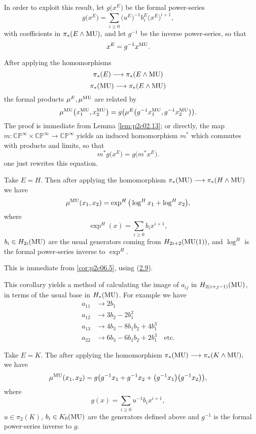 \documentclass[../main]{subfiles}
\begin{document}
In order to exploit this result, let $g\big(x^E\big)$ be the formal power-series
\begin{equation}
\label{eqn:p2c06.4}
\tag{6.4}
    g\big(x^E\big)=\sum_{i\geq 0}\big(u^E\big)^{-1}b_i^E\big(x^E\big)^{i+1},
\end{equation}
with coefficients in $\pi_\ast(E\wedge \mathrm{MU}),$ and let $g^{-1}$ be the inverse power-series, so that
\[x^E=g^{-1}x^{\mathrm{MU}}.\]

\begin{customcor}{6.5}
\label{cor:p2c06.5}
After applying the homomorphisms
\[\pi_\ast(E)\longrightarrow \pi_\ast(E\wedge \mathrm{MU})\]
\[\pi_\ast(\mathrm{MU})\longrightarrow \pi_\ast(E\wedge \mathrm{MU})\]
the formal products $\mu^E,\mu^{\mathrm{MU}}$ are related by 
\[\mu^{\mathrm{MU}}\big(x_1^{\mathrm{MU}},x_2^{\mathrm{MU}}\big)=g\big(\mu^E\big(g^{-1}x_1^{\mathrm{MU}},g^{-1}x_2^{\mathrm{MU}}\big)\big).\]
The proof is immediate from Lemma \ref{lem:p2c02.13}; or directly, the map \newline $m:\mathbb{CP}^\infty\times\mathbb{CP}^\infty\longrightarrow \mathbb{CP}^\infty$ yields an induced homomorphism $m^\ast$ which commutes with products and limits, so that 
\[m^\ast g\big(x^E\big)=g\big(m^\ast x^E\big).\]
one just rewrites this equation.
\end{customcor}
\begin{customcor}{6.6}
\label{cor:p2c06.6}
Take $E=H.$ Then after applying the homomorphism $\pi_\ast(\mathrm{MU})\longrightarrow \pi_\ast(H\wedge \mathrm{MU})$ we have 
\[\mu^{\mathrm{MU}}(x_1,x_2)=\exp^H\big(\log^Hx_1+\log^Hx_2\big),\]
where 
\[\exp^H(x)=\sum_{i\geq 0}b_ix^{i+1},\]
$b_i\in H_{2i}(\mathrm{MU})$ are the usual generators coming from $H_{2i+2}(\mathrm{MU}(1))$, and $\log^H$ is the formal power-series inverse to $\exp^H$.
\end{customcor}
This is immediate from \eqref{cor:p2c06.5}, using (\hyperref[ex:p2c02.9]{2.9}).

This corollary yields a method of calculating the image of $a_{ij}$ in $H_{2(i+j-1)}(\mathrm{MU})$, in terms of the usual base in $H_\ast(\mathrm{MU})$. For example we have 
\begin{align*}
    a_{11} &\longrightarrow 2b_1  \\
    a_{12} &\longrightarrow 3b_2-2b_1^2  \\ 
    a_{13} &\longrightarrow 4b_3-8b_1b_2+4b_1^3  \\
    a_{22} &\longrightarrow 6b_3-6b_1b_2+2b_1^3 \quad \text{etc.} 
\end{align*}
\begin{customcor}{6.7}
\label{cor:p2c06.7}
Take $E=K$. The after applying the homomorphism $\pi_\ast(\mathrm{MU})\longrightarrow \pi_\ast(K\wedge \mathrm{MU}),$ we have
\[\mu^{\mathrm{MU}}(x_1,x_2)=g\big(g^{-1}x_1+g^{-1}x_2+\big(g^{-1}x_1\big)\big(g^{-1}x_2\big)\big),\]
where 
\[g(x)=\sum_{i\geq 0} u^{-1}b_ix^{i+1},\]
$u\in \pi_2(K)$, $b_i\in K_0(\mathrm{MU})$ are the generators defined above and $g^{-1}$ is the formal power-series inverse to $g$.
\end{customcor}
\end{document}
